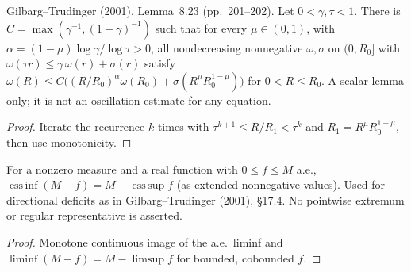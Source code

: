 \begin{lemma}
  \label{lem:gt-scalar-modulus-iteration}
  \leanok
  Gilbarg--Trudinger (2001), Lemma~8.23 (pp.~201--202). Let $0<\gamma,\tau<1$. There is $C=\max(\gamma^{-1},(1-\gamma)^{-1})$
  such that for every $\mu\in(0,1)$, with $\alpha=(1-\mu)\log\gamma/\log\tau>0$, all nondecreasing nonnegative $\omega,\sigma$ on
  $(0,R_0]$ with $\omega(\tau r)\le\gamma\,\omega(r)+\sigma(r)$ satisfy
  $\omega(R)\le C\bigl((R/R_0)^{\alpha}\omega(R_0)+\sigma(R^{\mu}R_0^{1-\mu})\bigr)$ for $0<R\le R_0$. A scalar lemma only; it is
  not an oscillation estimate for any equation.
\end{lemma}
\begin{proof}
  \leanok
  Iterate the recurrence $k$ times with $\tau^{k+1}\le R/R_1<\tau^k$ and $R_1=R^{\mu}R_0^{1-\mu}$, then use monotonicity.
\end{proof}

\begin{lemma}
  \label{lem:essential-deficit-identity}
  \leanok
  For a nonzero measure and a real function with $0\le f\le M$ a.e.,
  $\operatorname{ess\,inf}(M-f)=M-\operatorname{ess\,sup}f$ (as extended nonnegative values). Used for directional deficits as
  in Gilbarg--Trudinger (2001), \S17.4. No pointwise extremum or regular representative is asserted.
\end{lemma}
\begin{proof}
  \leanok
  Monotone continuous image of the a.e.\ liminf and $\liminf(M-f)=M-\limsup f$ for bounded, cobounded $f$.
\end{proof}

